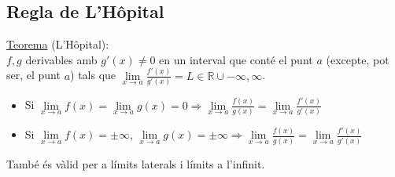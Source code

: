 \documentclass[../main.tex]{subfiles}
\begin{document}
    \subsection{Regla de L'Hôpital}
    \underline{Teorema} (L'Hôpital):\\
    $f, g$ derivables amb $g'(x) \neq 0$ en un interval que conté el punt $a$ (excepte, pot ser, el punt $a$) tals que $\lim\limits_{x \rightarrow a} \frac{f'(x)}{g'(x)} = L \in \mathbb{R} \cup {-\infty, \infty}$.
    \begin{itemize}
        \item Si $\lim\limits_{x \rightarrow a} f(x) = \lim\limits_{x \rightarrow a} g(x) = 0 \Rightarrow \lim\limits_{x \rightarrow a} \frac{f(x)}{g(x)} = \lim\limits_{x \rightarrow a} \frac{f'(x)}{g'(x)}$
        \item Si $\lim\limits_{x \rightarrow a} f(x) = \pm \infty$, $\lim\limits_{x \rightarrow a} g(x) = \pm \infty \Rightarrow \lim\limits_{x \rightarrow a} \frac{f(x)}{g(x)} = \lim\limits_{x \rightarrow a} \frac{f'(x)}{g'(x)}$
    \end{itemize}
    També és vàlid per a límits laterals i límits a l'infinit. 
\end{document}
